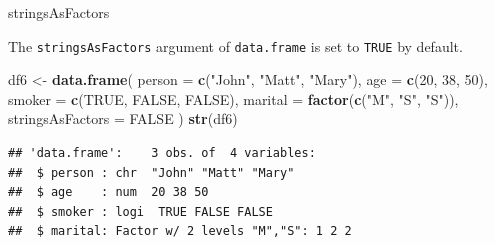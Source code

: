 \documentclass[ignorenonframetext,]{beamer}
\newenvironment{Shaded}{\begin{snugshade}}{\end{snugshade}}
\newcommand{\DataTypeTok}[1]{\textcolor[rgb]{0.13,0.29,0.53}{#1}}
\newcommand{\DecValTok}[1]{\textcolor[rgb]{0.00,0.00,0.81}{#1}}
\newcommand{\KeywordTok}[1]{\textcolor[rgb]{0.13,0.29,0.53}{\textbf{#1}}}
\newcommand{\NormalTok}[1]{#1}
\newcommand{\OtherTok}[1]{\textcolor[rgb]{0.56,0.35,0.01}{#1}}
\newcommand{\StringTok}[1]{\textcolor[rgb]{0.31,0.60,0.02}{#1}}
\begin{document}
\begin{frame}[fragile]{stringsAsFactors}
\protect\hypertarget{stringsasfactors-1}{}

The \texttt{stringsAsFactors} argument of \texttt{data.frame} is set to
\texttt{TRUE} by default.

\begin{Shaded}
\begin{Highlighting}[]
\NormalTok{df6 <-}\StringTok{ }\KeywordTok{data.frame}\NormalTok{(}
  \DataTypeTok{person =} \KeywordTok{c}\NormalTok{(}\StringTok{"John"}\NormalTok{, }\StringTok{"Matt"}\NormalTok{, }\StringTok{"Mary"}\NormalTok{),}
  \DataTypeTok{age =} \KeywordTok{c}\NormalTok{(}\DecValTok{20}\NormalTok{, }\DecValTok{38}\NormalTok{, }\DecValTok{50}\NormalTok{),}
  \DataTypeTok{smoker =} \KeywordTok{c}\NormalTok{(}\OtherTok{TRUE}\NormalTok{, }\OtherTok{FALSE}\NormalTok{, }\OtherTok{FALSE}\NormalTok{),}
  \DataTypeTok{marital =} \KeywordTok{factor}\NormalTok{(}\KeywordTok{c}\NormalTok{(}\StringTok{"M"}\NormalTok{, }\StringTok{"S"}\NormalTok{, }\StringTok{"S"}\NormalTok{)),}
  \DataTypeTok{stringsAsFactors =} \OtherTok{FALSE}
\NormalTok{)}
\KeywordTok{str}\NormalTok{(df6)}
\end{Highlighting}
\end{Shaded}

\begin{verbatim}
## 'data.frame':    3 obs. of  4 variables:
##  $ person : chr  "John" "Matt" "Mary"
##  $ age    : num  20 38 50
##  $ smoker : logi  TRUE FALSE FALSE
##  $ marital: Factor w/ 2 levels "M","S": 1 2 2
\end{verbatim}

\end{frame}
\end{document}
